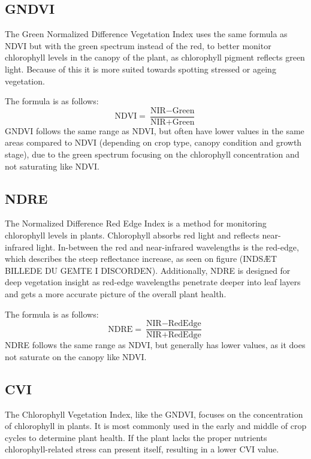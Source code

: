 \subsection{GNDVI}\label{GNDVI}
The Green Normalized Difference Vegetation Index uses the same formula as NDVI but with the green spectrum instead of the red, to better monitor chlorophyll levels in the canopy of the plant, as chlorophyll pigment reflects green light. Because of this it is more suited towards spotting stressed or ageing vegetation\cite{softfarm_vegetation_indices}.

The formula is as follows:
\begin{equation}
    \text{NDVI} = \frac{\text{NIR} - \text{Green}}{\text{NIR} + \text{Green}}
    \label{eq:ndvi}
\end{equation}
GNDVI follows the same range as NDVI, but often have lower values in the same areas compared to NDVI (depending on crop type, canopy condition and growth stage), due to the green spectrum focusing on the chlorophyll concentration and not saturating like NDVI\cite{softfarm_vegetation_indices}.

\subsection{NDRE}\label{NDRE}
The Normalized Difference Red Edge Index is a method for monitoring chlorophyll levels in plants. Chlorophyll absorbs red light and reflects near-infrared light. In-between the red and near-infrared wavelengths is the red-edge, which describes the steep reflectance increase, as seen on figure (INDSÆT BILLEDE DU GEMTE I DISCORDEN)\cite{geopera_red_edge}.
Additionally, NDRE is designed for deep vegetation insight as red-edge wavelengths penetrate deeper into leaf layers and gets a more accurate picture of the overall plant health\cite{eos_ndre}.

The formula is as follows:
\begin{equation}
    \text{NDRE} = \frac{\text{NIR} - \text{RedEdge}}{\text{NIR} + \text{RedEdge}}
    \label{eq:ndre}
\end{equation}
NDRE follows the same range as NDVI, but generally has lower values, as it does not saturate on the canopy like NDVI.

\subsection{CVI}\label{CVI}
The Chlorophyll Vegetation Index, like the GNDVI, focuses on the concentration of chlorophyll in plants. It is most commonly used in the early and middle of crop cycles to determine plant health. If the plant lacks the proper nutrients chlorophyll-related stress can present itself, resulting in a lower CVI value\cite{softfarm_vegetation_indices}.

